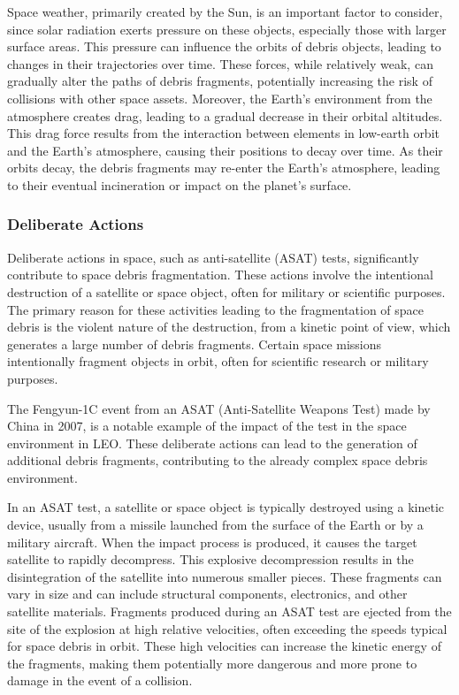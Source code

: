 \documentclass[letterpaper, paper,11pt]{AAS}
\begin{document}
Space weather, primarily created by the Sun, is an important factor to consider, since solar radiation exerts pressure on these objects, especially those with larger surface areas. This pressure can influence the orbits of debris objects, leading to changes in their trajectories over time. These forces, while relatively weak, can gradually alter the paths of debris fragments, potentially increasing the risk of collisions with other space assets. Moreover, the Earth's environment from the atmosphere creates drag, leading to a gradual decrease in their orbital altitudes. This drag force results from the interaction between elements in low-earth orbit and the Earth's atmosphere, causing their positions to decay over time. As their orbits decay, the debris fragments may re-enter the Earth's atmosphere, leading to their eventual incineration or impact on the planet's surface.

\subsubsection{Deliberate Actions}
Deliberate actions in space, such as anti-satellite (ASAT) tests, significantly contribute to space debris fragmentation. These actions involve the intentional destruction of a satellite or space object, often for military or scientific purposes. The primary reason for these activities leading to the fragmentation of space debris is the violent nature of the destruction, from a kinetic point of view, which generates a large number of debris fragments. Certain space missions intentionally fragment objects in orbit, often for scientific research or military purposes. 

The Fengyun-1C event from an ASAT (Anti-Satellite Weapons Test) made by China in 2007, is a notable example of the impact of the test in the space environment in LEO. These deliberate actions can lead to the generation of additional debris fragments, contributing to the already complex space debris environment.

 In an ASAT test, a satellite or space object is typically destroyed using a kinetic device, usually from a missile launched from the surface of the Earth or by a military aircraft. When the impact process is produced, it causes the target satellite to rapidly decompress. This explosive decompression results in the disintegration of the satellite into numerous smaller pieces. These fragments can vary in size and can include structural components, electronics, and other satellite materials. Fragments produced during an ASAT test are ejected from the site of the explosion at high relative velocities, often exceeding the speeds typical for space debris in orbit. These high velocities can increase the kinetic energy of the fragments, making them potentially more dangerous and more prone to damage in the event of a collision.~\cite{sorge_orbital_2008}
\end{document}
